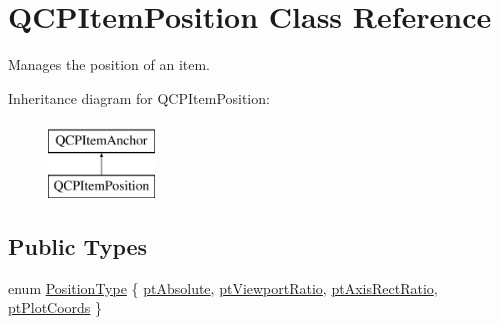 \hypertarget{class_q_c_p_item_position}{}\section{Q\+C\+P\+Item\+Position Class Reference}
\label{class_q_c_p_item_position}


Manages the position of an item.  


Inheritance diagram for Q\+C\+P\+Item\+Position\+:\begin{figure}[H]
\begin{center}
\leavevmode
\includegraphics[height=2.000000cm]{class_q_c_p_item_position}
\end{center}
\end{figure}
\subsection*{Public Types}
\begin{DoxyCompactItemize}
\item 
enum \mbox{\hyperlink{class_q_c_p_item_position_aad9936c22bf43e3d358552f6e86dbdc8}{Position\+Type}} \{ \mbox{\hyperlink{class_q_c_p_item_position_aad9936c22bf43e3d358552f6e86dbdc8a564f5e53e550ead1ec5fc7fc7d0b73e0}{pt\+Absolute}}, 
\mbox{\hyperlink{class_q_c_p_item_position_aad9936c22bf43e3d358552f6e86dbdc8ac7d6aa89ceacb39658b0d6da061c789a}{pt\+Viewport\+Ratio}}, 
\mbox{\hyperlink{class_q_c_p_item_position_aad9936c22bf43e3d358552f6e86dbdc8a01080fd00eaf09fa238ef6b73bbfef75}{pt\+Axis\+Rect\+Ratio}}, 
\mbox{\hyperlink{class_q_c_p_item_position_aad9936c22bf43e3d358552f6e86dbdc8ad5ffb8dc99ad73263f7010c77342294c}{pt\+Plot\+Coords}}
 \}
\end{DoxyCompactItemize}
